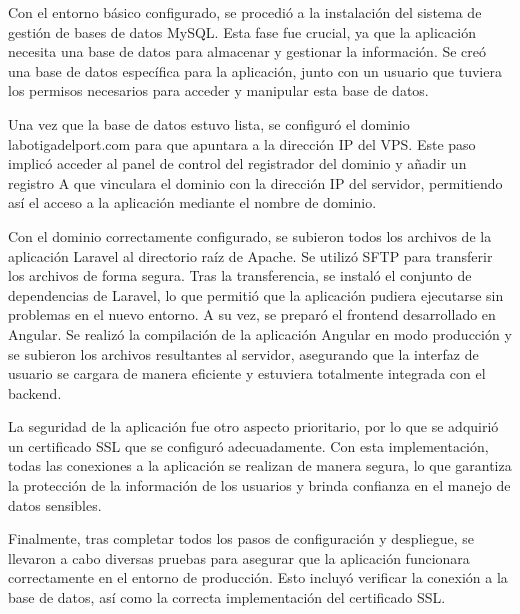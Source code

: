 \vspace{0.5cm}

Con el entorno básico configurado, se procedió a la instalación del sistema de gestión de bases de datos MySQL. Esta fase fue crucial, ya que la aplicación necesita una base de datos para almacenar y gestionar la información. Se creó una base de datos específica para la aplicación, junto con un usuario que tuviera los permisos necesarios para acceder y manipular esta base de datos.

\vspace{0.5cm}

Una vez que la base de datos estuvo lista, se configuró el dominio labotigadelport.com para que apuntara a la dirección IP del VPS. Este paso implicó acceder al panel de control del registrador del dominio y añadir un registro A que vinculara el dominio con la dirección IP del servidor, permitiendo así el acceso a la aplicación mediante el nombre de dominio.

\vspace{0.5cm}

Con el dominio correctamente configurado, se subieron todos los archivos de la aplicación Laravel al directorio raíz de Apache. Se utilizó SFTP para transferir los archivos de forma segura. Tras la transferencia, se instaló el conjunto de dependencias de Laravel, lo que permitió que la aplicación pudiera ejecutarse sin problemas en el nuevo entorno. A su vez, se preparó el frontend desarrollado en Angular. Se realizó la compilación de la aplicación Angular en modo producción y se subieron los archivos resultantes al servidor, asegurando que la interfaz de usuario se cargara de manera eficiente y estuviera totalmente integrada con el backend.

\vspace{0.5cm}

La seguridad de la aplicación fue otro aspecto prioritario, por lo que se adquirió un certificado SSL que se configuró adecuadamente. Con esta implementación, todas las conexiones a la aplicación se realizan de manera segura, lo que garantiza la protección de la información de los usuarios y brinda confianza en el manejo de datos sensibles.

\vspace{0.5cm}

Finalmente, tras completar todos los pasos de configuración y despliegue, se llevaron a cabo diversas pruebas para asegurar que la aplicación funcionara correctamente en el entorno de producción. Esto incluyó verificar la conexión a la base de datos, así como la correcta implementación del certificado SSL.

